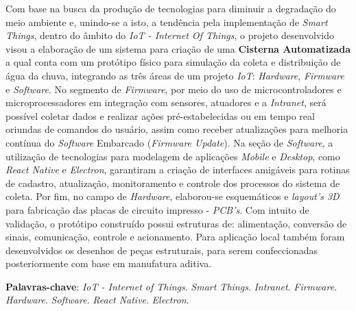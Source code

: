
\begin{resumo}[RESUMO]
\begin{SingleSpacing}

 Com base na busca da produção de tecnologias para diminuir a degradação do meio ambiente e, unindo-se a isto, a tendência pela implementação de \textit{Smart Things}, dentro do âmbito do \textit{IoT - Internet Of Things},  o projeto desenvolvido visou a elaboração de um sistema para criação de uma \textbf{Cisterna Automatizada} a qual conta com um protótipo físico para simulação da coleta e distribuição de água da chuva, integrando as três áreas de um projeto \textit{IoT}: \textit{Hardware}, \textit{Firmware} e \textit{Software}. No segmento de \textit{Firmware}, por meio do uso de microcontroladores e microprocessadores em integração com sensores, atuadores e a \textit{Intranet}, será possível coletar dados e realizar ações pré-estabelecidas ou em tempo real oriundas de comandos do usuário, assim como receber atualizações para melhoria contínua do \textit{Software} Embarcado (\textit{Firmware Update}).  Na seção de \textit{Software}, a utilização de tecnologias para modelagem de aplicações \textit{Mobile} e \textit{Desktop}, como  \textit{React Native} e \textit{Electron},  garantiram a criação de interfaces amigáveis para rotinas de cadastro, atualização, monitoramento e controle dos processos do sistema de coleta. Por fim, no campo de \textit{Hardware}, elaborou-se esquemáticos e \textit{layout's 3D} para fabricação das placas de circuito impresso - \textit{PCB's}. Com intuito de validação, o protótipo construído possui estruturas de: alimentação, conversão de sinais, comunicação, controle e acionamento. Para aplicação local também foram desenvolvidos os desenhos de peças estruturais, para serem confeccionadas posteriormente com base em manufatura aditiva.
 
\vspace{\onelineskip}

\textbf{Palavras-chave}: \textit{IoT - Internet of Things}. \textit{Smart Things}. \textit{Intranet}.   \textit{Firmware}. \textit{Hardware}. \textit{Software}. \textit{React Native}. \textit{Electron}.

\end{SingleSpacing}
\end{resumo}


